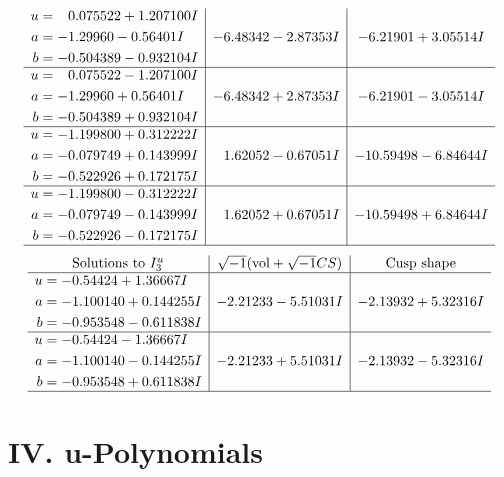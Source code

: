 \documentclass[1p]{elsarticle_modified}
\theoremstyle{definition}
\newcommand{\I}{\sqrt{-1}}
\begin{document}
$$\begin{array}{c|c|c}
\begin{aligned}
u &= \phantom{-}0.075522 + 1.207100 I \\
a &= -1.29960 - 0.56401 I \\
b &= -0.504389 - 0.932104 I\end{aligned}
 & -6.48342 - 2.87353 I & -6.21901 + 3.05514 I \\ \hline\begin{aligned}
u &= \phantom{-}0.075522 - 1.207100 I \\
a &= -1.29960 + 0.56401 I \\
b &= -0.504389 + 0.932104 I\end{aligned}
 & -6.48342 + 2.87353 I & -6.21901 - 3.05514 I \\ \hline\begin{aligned}
u &= -1.199800 + 0.312222 I \\
a &= -0.079749 + 0.143999 I \\
b &= -0.522926 + 0.172175 I\end{aligned}
 & \phantom{-}1.62052 - 0.67051 I & -10.59498 - 6.84644 I \\ \hline\begin{aligned}
u &= -1.199800 - 0.312222 I \\
a &= -0.079749 - 0.143999 I \\
b &= -0.522926 - 0.172175 I\end{aligned}
 & \phantom{-}1.62052 + 0.67051 I & -10.59498 + 6.84644 I\\
 \hline 
 \end{array}$$\newpage$$\begin{array}{c|c|c}  
\text{Solutions to }I^u_{3}& \I (\text{vol} + \sqrt{-1}CS) & \text{Cusp shape}\\
 \hline 
\begin{aligned}
u &= -0.54424 + 1.36667 I \\
a &= -1.100140 + 0.144255 I \\
b &= -0.953548 - 0.611838 I\end{aligned}
 & -2.21233 - 5.51031 I & -2.13932 + 5.32316 I \\ \hline\begin{aligned}
u &= -0.54424 - 1.36667 I \\
a &= -1.100140 - 0.144255 I \\
b &= -0.953548 + 0.611838 I\end{aligned}
 & -2.21233 + 5.51031 I & -2.13932 - 5.32316 I\\
 \hline 
 \end{array}$$\newpage
\newpage\renewcommand{\arraystretch}{1}
\centering \section*{ IV. u-Polynomials}
\end{document}
